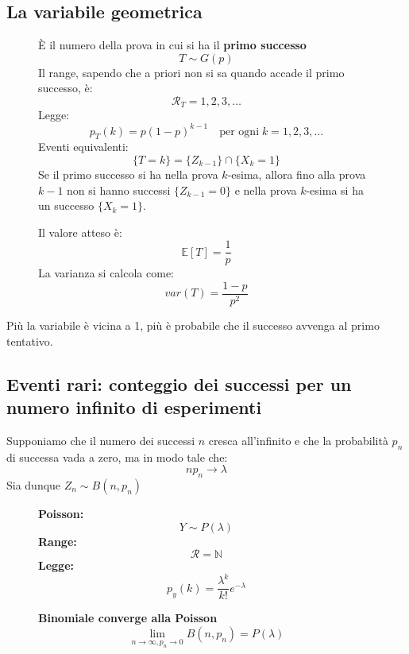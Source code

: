 \documentclass[a4paper]{article}
\theoremstyle{break}
\theoremstyle{break}
\theoremstyle{break}
\theoremstyle{break}
\begin{document}
\subsection{La variabile geometrica}
\begin{figure}[H]
  \begin{definition}
    È il numero della prova in cui si ha il \textbf{primo successo}
    \[
      T \sim G(p)
    \] 
    Il range, sapendo che a priori non si sa quando accade il primo successo, è:
    \[
      \mathcal{R}_T = 1,2,3, \ldots
    \] 
    Legge:
    \[
      p_T(k) = p(1-p)^{k-1} \quad \text{per ogni} \; k = 1,2,3, \ldots
    \] 
    Eventi equivalenti:
    \[
      \{T = k\} = \{Z_{k-1}\} \cap \{X_k = 1\}
    \] 
    Se il primo successo si ha nella prova \( k \)-esima, allora fino alla prova
    \( k - 1 \)  non si hanno successi \( \{Z_{k-1} = 0\} \)  e nella prova 
    \(  k \)-esima si ha un successo \( \{X_k = 1\} \).


    \vspace{1em}
    \noindent Il valore atteso è:
    \[
      \mathbb{E}[T] = \frac{1}{p}
    \] 
    La varianza si calcola come:
    \[
    var(T) = \frac{1-p}{p^2}
    \] 
  \end{definition}
\end{figure}
Più la variabile è vicina a 1, più è probabile che il successo avvenga al primo tentativo.

\subsection{Eventi rari: conteggio dei successi per un numero infinito di esperimenti}
Supponiamo che il numero dei successi \( n \) cresca all'infinito e che la probabilità
\( p_n \) di successa vada a zero, ma in modo tale che:
\[
np_n \to \lambda
\] 
Sia dunque \( Z_n \sim B(n,p_n) \) 

\begin{figure}[H]
  \begin{definition}[Poisson]
    \textbf{Poisson:}
    \[
    Y \sim P(\lambda)
    \] 
    \textbf{Range:}
    \[
      \mathcal{R} = \mathbb{N}
    \] 
    \textbf{Legge:}
    \[
      p_y(k) = \frac{\lambda^k}{k!}e^{-\lambda}
    \] 
  \end{definition}
\end{figure}

\begin{figure}[H]
  \begin{definition}
    \textbf{Binomiale converge alla Poisson}
    \[
    \lim_{n \to \infty, p_n \to 0} B(n,p_n) = P(\lambda)
    \] 
  \end{definition}
\end{figure}
\end{document}
